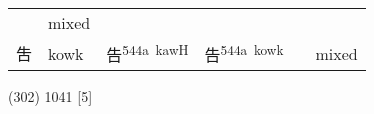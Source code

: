 \documentclass[14pt,a4paper]{scrartcl}
\begin{document}
\begin{longtable}[c]{@{}llllll@{}}
\begin{minipage}[t]{0.14\columnwidth}
\strut\end{minipage} &
\begin{minipage}[t]{0.14\columnwidth}\raggedright\strut
mixed
\strut\end{minipage}\tabularnewline
\begin{minipage}[t]{0.14\columnwidth}\raggedright\strut
吿
\strut\end{minipage} &
\begin{minipage}[t]{0.14\columnwidth}\raggedright\strut
kowk
\strut\end{minipage} &
\begin{minipage}[t]{0.14\columnwidth}\raggedright\strut
告\textsuperscript{544a~kawH}
\strut\end{minipage} &
\begin{minipage}[t]{0.14\columnwidth}\raggedright\strut
告\textsuperscript{544a~kowk}
\strut\end{minipage} &
\begin{minipage}[t]{0.14\columnwidth}\raggedright\strut
\strut\end{minipage} &
\begin{minipage}[t]{0.14\columnwidth}\raggedright\strut
mixed
\strut\end{minipage}\tabularnewline
\bottomrule
\end{longtable}

(302) 1041 {[}5{]}
\end{document}
